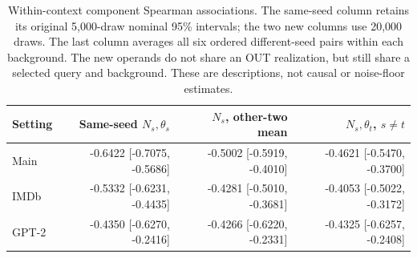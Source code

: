 \begin{table}[tp]
\centering
\footnotesize
\setlength{\tabcolsep}{3pt}
\begin{tabular}{lrrr}
\toprule
Setting & Same-seed $N_s,\theta_s$ & $N_s$, other-two mean & $N_s,\theta_t$, $s\ne t$ \\
\midrule
Main & -0.6422 [-0.7075, -0.5686] & -0.5002 [-0.5919, -0.4010] & -0.4621 [-0.5470, -0.3700] \\
IMDb & -0.5332 [-0.6231, -0.4435] & -0.4281 [-0.5010, -0.3681] & -0.4053 [-0.5022, -0.3172] \\
GPT-2 & -0.4350 [-0.6270, -0.2416] & -0.4266 [-0.6220, -0.2331] & -0.4325 [-0.6257, -0.2408] \\
\bottomrule
\end{tabular}
\caption{Within-context component Spearman associations. The same-seed column retains its original 5,000-draw nominal 95\% intervals; the two new columns use 20,000 draws. The last column averages all six ordered different-seed pairs within each background. The new operands do not share an OUT realization, but still share a selected query and background. These are descriptions, not causal or noise-floor estimates.}
\label{tab:review_components}
\end{table}
